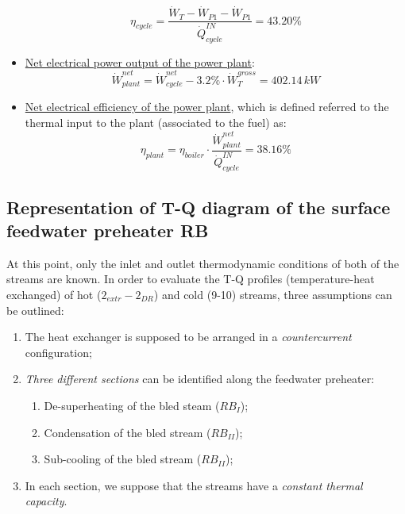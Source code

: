 \documentclass[a4paper,12pt]{article}
\newcommand{\kw}[0]{\,kW}
\begin{document}
\begin{itemize}
\begin{equation}
\eta_{cycle} = \frac{\dot{W}_T - \dot{W}_{P1} - \dot{W}_{P1}}{\dot{Q}^{IN}_{cycle}}
 = 43.20 \%
\end{equation}
%
\item \underline{Net electrical power output of the power plant}:
\begin{equation}
\dot{W}^{net}_{plant} = \dot{W}^{net}_{cycle} - 3.2\% \cdot \dot{W}^{gross}_T = 402.14 \kw 
\end{equation}
%
\item \underline{Net electrical efficiency of the power plant}, which is defined referred to the thermal input to the plant (associated to the fuel) as: 
\begin{equation}
\eta_{plant} = \eta_{boiler} \cdot \frac{\dot{W}^{net}_{plant}}{\dot{Q}^{IN}_{cycle}}
 = 38.16 \%
\end{equation}
\end{itemize}

\subsection{Representation of T-Q diagram of the surface feedwater preheater RB}
At this point, only the inlet and outlet thermodynamic conditions of both of the streams are known. In order to evaluate the T-Q profiles (temperature-heat exchanged) of hot ($2_{extr}-2_{DR}$) and cold (9-10) streams, three assumptions can be outlined:
\begin{enumerate}
\item The heat exchanger is supposed to be arranged in a \emph{countercurrent} configuration;
\item \emph{Three different sections} can be identified along the feedwater preheater:
	\begin{enumerate}
	\item De-superheating of the bled steam ($RB_I$);
	\item Condensation of the bled stream ($RB_{II}$);
	\item Sub-cooling of the bled stream ($RB_{II}$);
	\end{enumerate}
\item In each section, we suppose that the streams have a \emph{constant thermal capacity}.
\end{enumerate}
\end{document}
